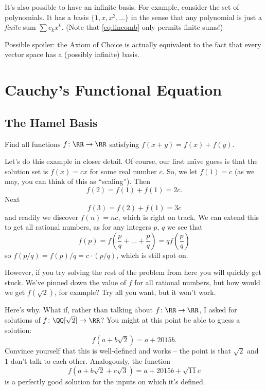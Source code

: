 \documentclass[11pt]{scrartcl}
\begin{document}
It's also possible to have an infinite basis.
For example, consider the set of polynomials.
It has a basis $\{1, x, x^2, \dots\}$ in the sense that any polynomial
is just a \emph{finite} sum $\sum c_k x^k$.
(Note that \eqref{eq:lincomb} only permits finite sums!)

\begin{remark}
  Possible spoiler:
  the Axiom of Choice is actually equivalent to the fact
  that every vector space has a (possibly infinite) basis.
\end{remark}


\section{Cauchy's Functional Equation}
\subsection{The Hamel Basis}
\begin{example}
  Find all functions $f \colon \RR \to \RR$ satisfying $f(x+y) = f(x)+f(y)$.
\end{example}
Let's do this example in closer detail.
Of course, our first na\"{\i}ve guess is that the solution set
is $f(x) = cx$ for some real number $c$.
So, we let $f(1) = c$ (as we may, you can think of this as ``scaling'').
Then
\[ f(2) = f(1) + f(1) = 2c. \]
Next
\[ f(3) = f(2) + f(1) = 3c \]
and readily we discover $f(n) = nc$, which is right on track.
We can extend this to get all rational numbers, as for any integers $p$, $q$ we see that
\[
  f\left( p \right)
  = f\left( \frac pq + \dots + \frac pq \right)
  = q f\left( \frac pq \right) \]
so $f(p/q) = f(p) / q = c \cdot (p/q)$, which is still spot on.

However, if you try solving the rest of the problem from here you will quickly get stuck.
We've pinned down the value of $f$ for all rational numbers,
but how would we get $f(\sqrt 2)$, for example?
Try all you want, but it won't work.

Here's why.
What if, rather than talking about $f \colon \RR \to \RR$,
I asked for solutions of $f \colon \QQ[\sqrt 2] \to \RR$?
You might at this point be able to guess a solution:
\[
  f\left( a + b \sqrt 2 \right)
  = a + 2015b.
\]
Convince yourself that this is well-defined and works --
the point is that $\sqrt 2$ and $1$ don't talk to each other.
Analogously, the function
\[
  f\left( a + b \sqrt 2 + c \sqrt 3 \right)
  = a + 2015b + \sqrt{11} c
\]
is a perfectly good solution for the inputs on which it's defined.
\end{document}
